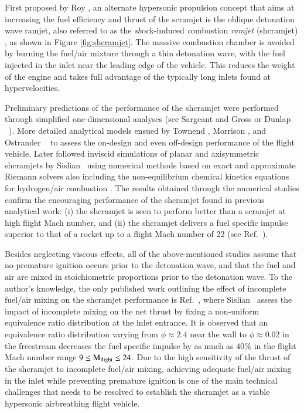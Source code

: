 First proposed by Roy \cite{misc:1946:roy}, an alternate hypersonic propulsion concept
that aims at increasing the fuel
efficiency and thrust of the scramjet is the oblique detonation wave ramjet, also
referred to as the \emph{sh}ock-induced \emph{c}ombustion \emph{ramjet} (shcramjet)
\cite{aiaabook:2001:sislian,nasa:2000:jones}, as shown
in Figure \ref{fig:shcramjet}.  The massive
combustion chamber is avoided by burning the fuel/air mixture through a thin detonation
wave, with the fuel injected  in the inlet near the leading edge of the vehicle. This
reduces the weight of the engine and takes full advantage of the typically long inlets
found at hypervelocities.

Preliminary predictions of the performance of the shcramjet were
performed through
simplified one-dimensional analyses (see Sargeant and Gross \cite{misc:1959:sargeant}
or Dunlap \etal\ \cite{misc:1978:dunlap}). More detailed analytical
models ensued by Townend \cite{misc:1970:townend},
Morrison \cite{nasa:1978:morrison,nasa:1980:morrison},
and Ostrander \etal\ \cite{aiaaconf:1987:ostrander} to
assess the on-design and even off-design performance of the flight vehicle.
Later followed inviscid simulations of planar and axisymmetric
shcramjets by Sislian \etal\ using numerical methods based on exact and approximate
Riemann solvers
\cite{aiaaconf:1989:sislian,aiaaconf:1992:atamanchuk} also including
the non-equilibrium chemical kinetics equations for hydrogen/air combustion
\cite{jpp:1998:dudebout}.
The results obtained through the numerical studies confirm the encouraging
performance of the shcramjet found in previous analytical
work: (i) the shcramjet is seen to perform better than
a scramjet at high flight Mach number, and (ii) the shcramjet delivers a
fuel specific impulse superior to that of a rocket
up to a flight Mach number of 22 (see Ref.~\cite{jpp:1998:dudebout}).


Besides neglecting viscous effects, all of the above-mentioned studies assume
that no premature ignition occurs prior to the detonation wave, and
that the fuel and air are mixed in stoichiometric proportions prior to the
detonation wave.
To the author's knowledge, the only published work outlining the effect of
incomplete fuel/air mixing on the shcramjet performance is
Ref.~\cite{jpp:2000:sislian}, where Sislian \etal\ 
assess the impact of incomplete mixing on the net thrust by fixing
a non-uniform equivalence ratio distribution at the inlet entrance. It is observed that
an equivalence ratio distribution varying from $\phi \approx 2.4$ near the wall
to $\phi\approx 0.02$ in the freestream decreases the fuel specific impulse
by as much as $40\%$ in the flight Mach number range $9 \leq {\rm M}_{\rm flight} \leq 24$.
Due to the high sensitivity of the thrust of the shcramjet to incomplete fuel/air mixing,
achieving adequate fuel/air mixing in the inlet while preventing premature
ignition is one of the main technical challenges that needs to be
resolved to establish the shcramjet as a viable hypersonic airbreathing
flight vehicle.


